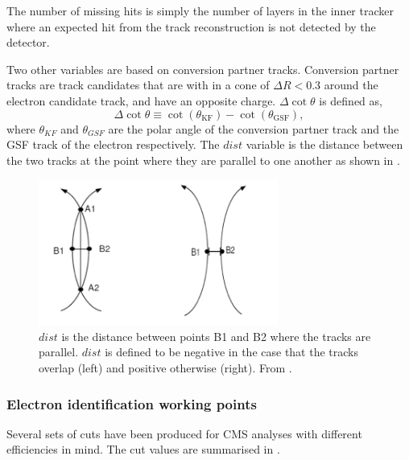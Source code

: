 The number of missing hits is simply the number of layers in the inner
tracker where an expected hit from the track reconstruction is not detected by
the detector.

Two other variables are based on conversion partner tracks.
Conversion partner tracks are track candidates that are with in a cone of $\Delta
R < 0.3$ around the electron candidate track, and have an opposite charge. 
$\Delta\cot\theta$ is defined as,
\begin{equation}
\Delta \cot \theta \equiv \cot(\theta_{\text{KF}}) - \cot(\theta_{\text{GSF}}),
\end{equation}
where $\theta_{KF}$ and $\theta_{GSF}$ are the polar angle of the conversion
partner track and the GSF track of the electron respectively.
The $dist$ variable is the distance between the two tracks at the point where
they are parallel to one another as shown in .

\begin{figure}[htbp]
  \centering
  \includegraphics[width=0.7\textwidth]{dist}
  \caption{$dist$ is the distance between points B1 and B2 where the tracks are
parallel. $dist$ is defined to be negative in the case that the tracks overlap
(left) and positive otherwise (right). From \cite{eConver}.}
  \label{fig:dist}
\end{figure}

\subsubsection{Electron identification working points}

Several sets of cuts have been produced for CMS analyses with different
efficiencies in mind. The cut values are summarised in 
\cite{nikos}.


